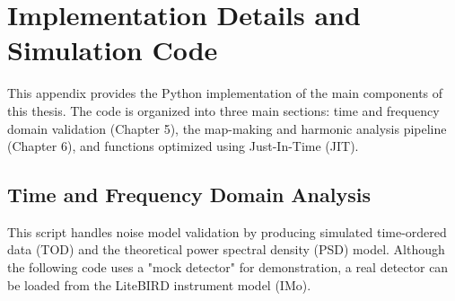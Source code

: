 \chapter{Implementation Details and Simulation Code}
\label{appendix:code}

This appendix provides the Python implementation of the main components of this thesis. The code is organized into three main sections: time and frequency domain validation (Chapter 5), the map-making and harmonic analysis pipeline (Chapter 6), and functions optimized using Just-In-Time (JIT).

\section{Time and Frequency Domain Analysis}
This script handles noise model validation by producing simulated time-ordered data (TOD) and the theoretical power spectral density (PSD) model. Although the following code uses a "mock detector" for demonstration, a real detector can be loaded from the LiteBIRD instrument model (IMo).

